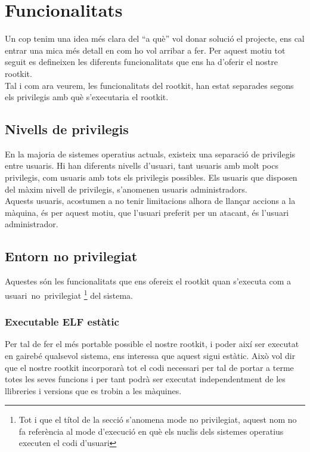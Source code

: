 \chapter{Funcionalitats}

Un cop tenim una idea més clara del ``a què'' vol donar solució el projecte, ens cal entrar una mica més
detall en com ho vol arribar a fer. Per aquest motiu tot seguit es defineixen les diferents funcionalitats 
que ens ha d'oferir el nostre rootkit. \\

Tal i com ara veurem, les funcionalitats del rootkit, han estat separades segons els privilegis amb què s'executaria 
el rootkit.

\section{Nivells de privilegis}

En la majoria de sistemes operatius actuals, existeix una separació de privilegis entre usuaris. Hi
han diferents nivells d'usuari, tant usuaris amb molt pocs privilegis, com usuaris amb tots els privilegis
possibles. Els usuaris que disposen del màxim nivell de privilegis, s'anomenen usuaris administradors. \\
Aquests usuaris, acostumen a no tenir limitacions alhora de llançar accions a la màquina, és per aquest
motiu, que l'usuari preferit per un atacant, és l'usuari administrador. \\

\section{Entorn no privilegiat}

Aquestes són les funcionalitats que ens ofereix el rootkit quan s'executa com a \mbox{usuari no privilegiat}
\footnote{Tot i que el títol de la secció s'anomena mode no privilegiat, aquest nom no fa referència al mode d'execució
en què els nuclis dels sistemes operatius executen el codi d'usuari} del sistema.

\subsection{Executable ELF estàtic}
Per tal de fer el més portable possible el nostre rootkit, i poder així ser executat en gairebé qualsevol sistema, ens 
interessa que aquest sigui estàtic. Això vol dir que el nostre rootkit incorporarà tot el codi necessari per tal de portar 
a terme totes les seves funcions i per tant podrà ser executat independentment de les llibreries i versions que es trobin a
les màquines.

